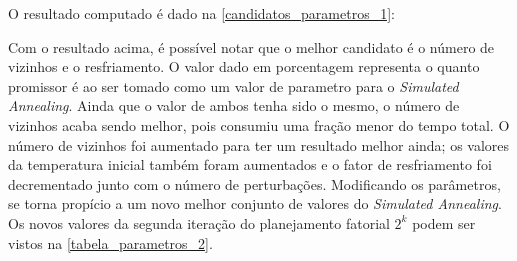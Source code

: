 \documentclass[
	12pt,				%
	twoside,			%
	a4paper,			%
	english,			%
	french,				%
	spanish,			%
	brazil				%
	]{abntex2}
\begin{document}
O resultado computado é dado na \autoref{candidatos_parametros_1}:

\begin{table}[ht]
    \centering
    \caption{Candidatos a parâmetros na primeira iteração.}
    \label{candidatos_parametros_1}
\end{table}

Com o resultado acima, é possível notar que o melhor candidato é o
número de vizinhos e o resfriamento. O valor dado em porcentagem
representa o quanto promissor é ao ser tomado como um valor de parametro
para o \emph{Simulated Annealing}. Ainda que o valor de ambos tenha sido
o mesmo, o número de vizinhos acaba sendo melhor, pois consumiu uma
fração menor do tempo total. O número de vizinhos foi aumentado para ter
um resultado melhor ainda; os valores da temperatura inicial também
foram aumentados e o fator de resfriamento foi decrementado junto com o
número de perturbações. Modificando os parâmetros, se torna propício a
um novo melhor conjunto de valores do \emph{Simulated Annealing}. Os
novos valores da segunda iteração do planejamento fatorial \(2^{k}\)
podem ser vistos na \autoref{tabela_parametros_2}.
\end{document}

